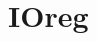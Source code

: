 \documentclass[./main.tex]{subfiles}
\begin{document}
	\section{IOreg}\label{sec:ioreg}
\end{document}
